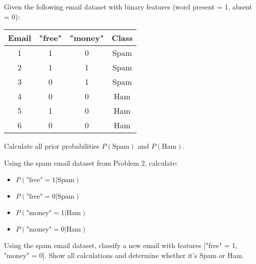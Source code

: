 \documentclass{article}
\newcounter{exercise}
\begin{document}
\begin{tcolorbox}[colback=gray!5!white,colframe=gray!75!black,title=Problem \stepcounter{exercise}: Spam Email Classification - Setup]

Given the following email dataset with binary features (word present = 1, absent = 0):

\begin{center}
\begin{tabular}{|c|c|c|c|}
\hline
Email & "free" & "money" & Class \\
\hline
1 & 1 & 0 & Spam \\
2 & 1 & 1 & Spam \\
3 & 0 & 1 & Spam \\
4 & 0 & 0 & Ham \\
5 & 1 & 0 & Ham \\
6 & 0 & 0 & Ham \\
\hline
\end{tabular}
\end{center}

Calculate all prior probabilities $P(\text{Spam})$ and $P(\text{Ham})$.
\end{tcolorbox}

\begin{tcolorbox}[colback=gray!5!white,colframe=gray!75!black,title=Problem \stepcounter{exercise}: Likelihood Calculation]

Using the spam email dataset from Problem 2, calculate:
\begin{itemize}
    \item $P(\text{"free"} = 1|\text{Spam})$
    \item $P(\text{"free"} = 0|\text{Spam})$
    \item $P(\text{"money"} = 1|\text{Ham})$
    \item $P(\text{"money"} = 0|\text{Ham})$
\end{itemize}
\end{tcolorbox}

\begin{tcolorbox}[colback=gray!5!white,colframe=gray!75!black,title=Problem \stepcounter{exercise}: Classification Decision]

Using the spam email dataset, classify a new email with features ["free" = 1, "money" = 0]. Show all calculations and determine whether it's Spam or Ham.
\end{tcolorbox}
\end{document}
